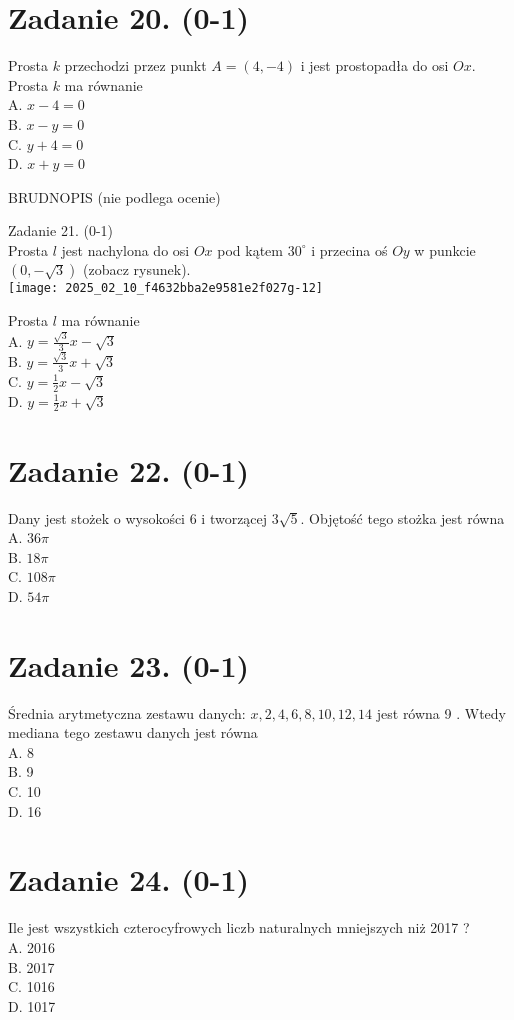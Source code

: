\documentclass[10pt]{article}
\begin{document}
\section*{Zadanie 20. (0-1)}
Prosta \(k\) przechodzi przez punkt \(A=(4,-4)\) i jest prostopadła do osi \(O x\). Prosta \(k\) ma równanie\\
A. \(x-4=0\)\\
B. \(x-y=0\)\\
C. \(y+4=0\)\\
D. \(x+y=0\)

BRUDNOPIS (nie podlega ocenie)\\
\(\qquad\)

Zadanie 21. (0-1)\\
Prosta \(l\) jest nachylona do osi \(O x\) pod kątem \(30^{\circ}\) i przecina oś \(O y\) w punkcie \((0,-\sqrt{3})\) (zobacz rysunek).\\
\texttt{[image: 2025\_02\_10\_f4632bba2e9581e2f027g-12]}

Prosta \(l\) ma równanie\\
A. \(y=\frac{\sqrt{3}}{3} x-\sqrt{3}\)\\
B. \(y=\frac{\sqrt{3}}{3} x+\sqrt{3}\)\\
C. \(y=\frac{1}{2} x-\sqrt{3}\)\\
D. \(y=\frac{1}{2} x+\sqrt{3}\)

\section*{Zadanie 22. (0-1)}
Dany jest stożek o wysokości 6 i tworzącej \(3 \sqrt{5}\). Objętość tego stożka jest równa\\
A. \(36 \pi\)\\
B. \(18 \pi\)\\
C. \(108 \pi\)\\
D. \(54 \pi\)

\section*{Zadanie 23. (0-1)}
Średnia arytmetyczna zestawu danych: \(x, 2,4,6,8,10,12,14\) jest równa 9 . Wtedy mediana tego zestawu danych jest równa\\
A. 8\\
B. 9\\
C. 10\\
D. 16

\section*{Zadanie 24. (0-1)}
Ile jest wszystkich czterocyfrowych liczb naturalnych mniejszych niż 2017 ?\\
A. 2016\\
B. 2017\\
C. 1016\\
D. 1017
\end{document}

